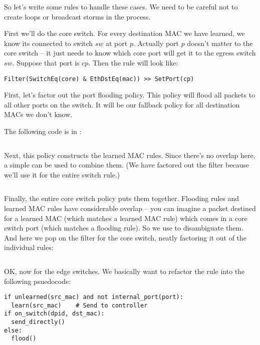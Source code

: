 So let's write some rules to handle these cases.  We need to be careful not to create loops or broadcast
storms in the process.  

First we'll do the core switch.  For every destination MAC we have learned, we know its connected to
switch $sw$ at port $p$.  Actually port $p$ doesn't matter to the core switch -- it just needs to know
which core port will get it to the egress switch $sw$.  Suppose that port is $cp$.  Then the rule will look
like:

\begin{verbatim}
Filter(SwitchEq(core) & EthDstEq(mac)) >> SetPort(cp) 
\end{verbatim}

First, let's factor out the port flooding policy. 
This policy will flood all packets to all other ports on the switch.  
It will be our fallback policy for all destination MACs
we don't know.  

The following code is in :

\inputminted[firstline=22,lastline=31]{python}{code/multiswitch_topologies/multiswitch2.py}

Next, this policy constructs the learned MAC rules.  Since there's no overlap here, a simple
 can be used to combine them.  (We have factored out the  filter
because we'll use it for the entire switch rule.)

\inputminted[firstline=60,lastline=68]{python}{code/multiswitch_topologies/multiswitch2.py}

Finally, the entire core switch policy puts them together.  Flooding rules and learned MAC rules have
considerable overlap -- you can imagine a packet destined for a learned MAC (which matches a learned
MAC rule) which comes in a core switch port (which matches a flooding rule).  So we use 
to disambiguate them.  And here we pop on the filter for the core switch, neatly factoring it out 
of the individual rules:

\inputminted[firstline=70,lastline=78]{python}{code/multiswitch_topologies/multiswitch2.py}

OK, now for the edge switches.  We basically want to refactor the rule into the following psuedocode:

\begin{verbatim}
if unlearned(src_mac) and not internal_port(port):  
  learn(src_mac)    # Send to controller
if on_switch(dpid, dst_mac):
  send_directly()
else:
  flood()
\end{verbatim}

